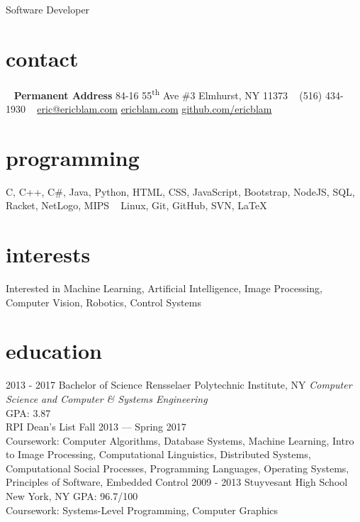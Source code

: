 \documentclass[]{friggeri-cv}
\begin{document}
       {Software Developer}


\begin{aside}
  \section{contact}
    ~
    \textbf{Permanent Address}
    84-16 55\textsuperscript{th} Ave
    \#3
    Elmhurst, NY 11373
    ~
    (516) 434-1930
    ~
    \href{mailto:adrien@friggeri.net}{eric@ericblam.com}
    \href{http://ericblam.com}{ericblam.com}
    \href{http://github.com/ericblam}{github.com/ericblam}
  \section{programming}
    C, C++, C\#, Java, Python, HTML, CSS, JavaScript, Bootstrap, NodeJS, SQL, Racket, NetLogo, MIPS
    ~
    Linux, Git, GitHub, SVN, \LaTeX
\end{aside}

\section{interests}

Interested in Machine Learning, Artificial Intelligence, Image Processing, Computer Vision, Robotics, Control Systems

\section{education}

\begin{entrylist}
  \entry
    {2013 - 2017}
    {Bachelor of Science}
    {Rensselaer Polytechnic Institute, NY}
    {\emph{Computer Science and Computer \& Systems Engineering}\\
    GPA: 3.87\\
    RPI Dean's List Fall 2013 --- Spring 2017\\
    Coursework: Computer Algorithms, Database Systems, Machine Learning, Intro to Image Processing, Computational Linguistics, Distributed Systems, Computational Social Processes, Programming Languages, Operating Systems, Principles of Software, Embedded Control}
  \entry
    {2009 - 2013}
    {Stuyvesant High School}
    {New York, NY}
    {GPA: 96.7/100\\
    Coursework: Systems-Level Programming, Computer Graphics}
\end{entrylist}
\end{document}
